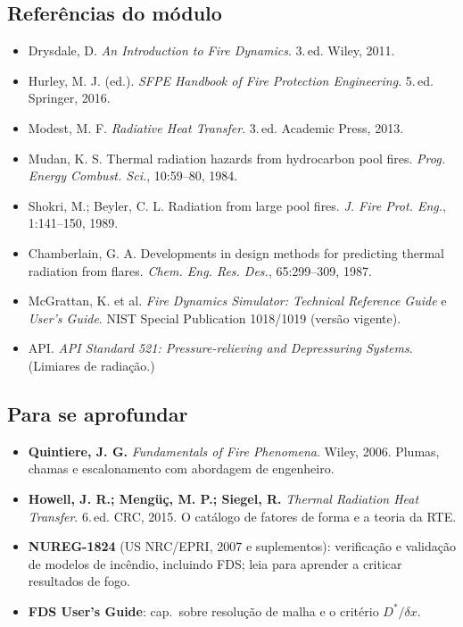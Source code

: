 \documentclass[10pt,a4paper,twocolumn,openany]{report}
\newenvironment{refs}{\subsection*{Referências do módulo}\small}{\par}
\newenvironment{aprofundar}{\subsection*{\textcolor{amarelo}{Para se aprofundar}}\small}{\par}
\begin{document}
\begin{refs}
\begin{itemize}
  \item Drysdale, D. \emph{An Introduction to Fire Dynamics}. 3.\,ed. Wiley, 2011.
  \item Hurley, M. J. (ed.). \emph{SFPE Handbook of Fire Protection Engineering}. 5.\,ed. Springer, 2016.
  \item Modest, M. F. \emph{Radiative Heat Transfer}. 3.\,ed. Academic Press, 2013.
  \item Mudan, K. S. Thermal radiation hazards from hydrocarbon pool fires. \emph{Prog. Energy Combust. Sci.}, 10:59--80, 1984.
  \item Shokri, M.; Beyler, C. L. Radiation from large pool fires. \emph{J. Fire Prot. Eng.}, 1:141--150, 1989.
  \item Chamberlain, G. A. Developments in design methods for predicting thermal radiation from flares. \emph{Chem. Eng. Res. Des.}, 65:299--309, 1987.
  \item McGrattan, K. et al. \emph{Fire Dynamics Simulator: Technical Reference Guide} e \emph{User's Guide}. NIST Special Publication 1018/1019 (versão vigente).
  \item API. \emph{API Standard 521: Pressure-relieving and Depressuring Systems}. (Limiares de radiação.)
\end{itemize}
\end{refs}

\begin{aprofundar}
\begin{itemize}[leftmargin=*]
  \item \textbf{Quintiere, J. G.} \emph{Fundamentals of Fire Phenomena}. Wiley, 2006. Plumas, chamas e escalonamento com abordagem de engenheiro.
  \item \textbf{Howell, J. R.; Mengüç, M. P.; Siegel, R.} \emph{Thermal Radiation Heat Transfer}. 6.\,ed. CRC, 2015. O catálogo de fatores de forma e a teoria da RTE.
  \item \textbf{NUREG-1824} (US NRC/EPRI, 2007 e suplementos): verificação e validação de modelos de incêndio, incluindo FDS; leia para aprender a criticar resultados de fogo.
  \item \textbf{FDS User's Guide}: cap.\ sobre resolução de malha e o critério $D^*/\delta x$.
\end{itemize}
\end{aprofundar}

\end{document}
